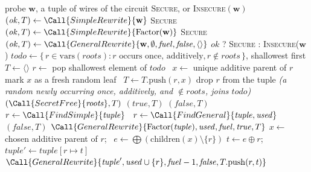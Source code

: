 \begin{algorithm}
\caption{Discharging a probe (Component I)}
\label{alg:rewrite-engine}
\begin{algorithmic}[1]
  \Require probe $\mathbf{w}$, a tuple of wires of the circuit
  \Ensure \textsc{Secure}, or \textsc{Insecure}$(\mathbf{w})$
  \State $(\mathit{ok}, T) \gets \Call{SimpleRewrite}{\mathbf{w}}$ 
   \Return \textsc{Secure} \EndIf
  \State $(\mathit{ok}, T) \gets \Call{SimpleRewrite}{\mathrm{Factor}(\mathbf{w})}$ 
   \Return \textsc{Secure} \EndIf
  \State $(\mathit{ok}, T) \gets \Call{GeneralRewrite}{\mathbf{w}, \emptyset, \mathit{fuel}, \mathit{false}, \langle\rangle}$ 
  \State \Return $\mathit{ok}$ ? \textsc{Secure} : \textsc{Insecure}($\mathbf{w}$)
\EndFunction
\Statex
{}
  \State $\mathit{todo} \gets \{\, r \in \mathrm{vars}(\mathit{roots}) : r \text{ occurs once, additively}, r \notin \mathit{roots} \,\}$, shallowest first
  \State $T \gets \langle\rangle$
    \State $r \gets$ pop shallowest element of $\mathit{todo}$
    \State \ $x \gets$ unique additive parent of $r$ 
    \State mark $x$ as a fresh random leaf
    \State \ $T \gets T.\mathrm{push}(r, x)$ 
    \State drop $r$ from the tuple
    \State \emph{(a random newly occurring once, additively, and $\notin \mathit{roots}$, joins $\mathit{todo}$)}
  \EndWhile
  \State \Return $(\Call{SecretFree}{\mathit{roots}}, T)$ 
\EndFunction
\Statex
{}
   \Return $(\mathit{true}, T)$ \EndIf
   \Return $(\mathit{false}, T)$ \EndIf
  \State $r \gets \Call{FindSimple}{\mathit{tuple}}$ 
   \ $r \gets \Call{FindGeneral}{\mathit{tuple}, \mathit{used}}$  \EndIf
     \Return $(\mathit{false}, T)$ \EndIf
    \State \Return $\Call{GeneralRewrite}{\mathrm{Factor}(\mathit{tuple}), \mathit{used}, \mathit{fuel}, \mathit{true}, T}$ 
  \EndIf
  \State $x \gets$ chosen additive parent of $r$; \ $e \gets \bigoplus(\mathrm{children}(x) \setminus \{r\})$ 
  \State $t \gets e \oplus r$; \ $\mathit{tuple}' \gets \mathit{tuple}[r \mapsto t]$ 
  \State \Return $\Call{GeneralRewrite}{\mathit{tuple}', \mathit{used} \cup \{r\}, \mathit{fuel}-1, \mathit{false}, T.\mathrm{push}(r,t)}$
\EndFunction
\end{algorithmic}
\end{algorithm}

